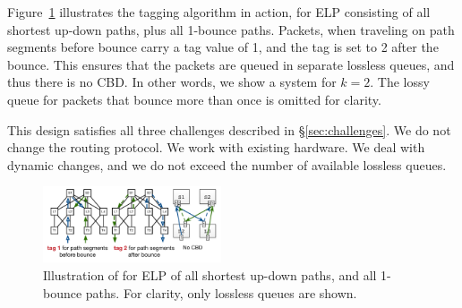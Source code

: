 
Figure~\ref{fig:clos_tagger} illustrates the tagging algorithm in action, for
ELP consisting of all shortest up-down paths, plus all 1-bounce paths.
Packets, when traveling on path segments before bounce carry a tag value of 1,
and the tag is set to 2 after the bounce. This ensures that the packets are
queued in separate lossless queues, and thus there is no CBD. In other words, we
show a system for $k=2$. The lossy queue for packets that bounce more than once
is omitted for clarity.


This design satisfies all three challenges described in \S\ref{sec:challenges}.
We do not change the routing protocol. We work with existing hardware. We deal
with dynamic changes, and we do not exceed the number of available
lossless queues.

\begin{figure}[t]
	\centering
	\includegraphics[width=0.47\textwidth] {figs/cbd_b}
		\vspace{-0.15in}
	\caption{Illustration of \sysname{} for ELP of all shortest up-down paths,
		and all 1-bounce paths. For clarity, only lossless queues are shown.}
	\label{fig:clos_tagger}
		\vspace{-0.25in}
\end{figure}

